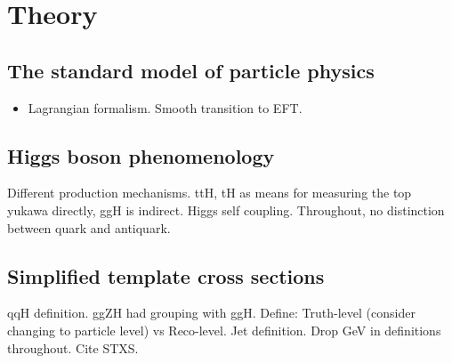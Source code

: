 \chapter{Theory}
\label{chap:theory}

\section{The standard model of particle physics}
\begin{itemize}
    \item Lagrangian formalism. Smooth transition to EFT.
\end{itemize}

\section{Higgs boson phenomenology}
Different production mechanisms. ttH, tH as means for measuring the top yukawa directly, ggH is indirect. Higgs self coupling. Throughout, no distinction between quark and antiquark.

\section{Simplified template cross sections}\label{sec:theory_stxs}
qqH definition. ggZH had grouping with ggH. Define: Truth-level (consider changing to particle level) vs Reco-level. Jet definition. Drop GeV in definitions throughout. Cite STXS.


